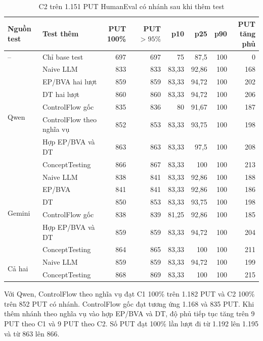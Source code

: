 \begin{table}[!htbp]
\centering
\caption{C2 trên 1.151 PUT HumanEval có nhánh sau khi thêm test}
\label{tab:coverage-he-c2}
\small
\begin{tabular*}{\linewidth}{@{\extracolsep{\fill}}llrrrrrr@{}}
\toprule
Nguồn test & Test thêm & \shortstack{PUT\\100\%} & \shortstack{PUT\\$>95\%$} & p10 & p25 & p90 & \shortstack{PUT\\tăng phủ} \\
\midrule
-- & Chỉ base test & 697 & 697 & 75 & 87,5 & 100 & 0 \\
\midrule
\multirow{7}{*}{Qwen} & Naive LLM & 833 & 833 & 83,33 & 92,86 & 100 & 168 \\
& EP/BVA hai lượt & 859 & 859 & 83,33 & 94,72 & 100 & 202 \\
& DT hai lượt & 860 & 860 & 83,33 & 94,72 & 100 & 206 \\
& ControlFlow gốc & 835 & 836 & 80 & 91,67 & 100 & 187 \\
& ControlFlow theo nghĩa vụ & 852 & 853 & 83,33 & 93,75 & 100 & 198 \\
& Hợp EP/BVA và DT & 863 & 863 & 83,33 & 97,5 & 100 & 208 \\
& ConceptTesting & 866 & 867 & 83,33 & 100 & 100 & 213 \\
\midrule
\multirow{6}{*}{Gemini} & Naive LLM & 838 & 841 & 83,33 & 92,86 & 100 & 188 \\
& EP/BVA & 841 & 841 & 83,33 & 92,86 & 100 & 186 \\
& DT & 850 & 853 & 83,33 & 93,75 & 100 & 198 \\
& ControlFlow gốc & 838 & 839 & 81,25 & 92,86 & 100 & 185 \\
& Hợp EP/BVA và DT & 859 & 859 & 83,33 & 94,72 & 100 & 204 \\
& ConceptTesting & 864 & 865 & 83,33 & 100 & 100 & 211 \\
\midrule
\multirow{2}{*}{Cả hai} & Naive LLM & 859 & 859 & 83,33 & 94,72 & 100 & 199 \\
& ConceptTesting & 868 & 869 & 83,33 & 100 & 100 & 215 \\
\bottomrule
\end{tabular*}
\end{table}

Với Qwen, ControlFlow theo nghĩa vụ đạt C1 100\% trên 1.182 PUT và C2 100\% trên 852 PUT có nhánh. ControlFlow gốc đạt tương ứng 1.168 và 835 PUT. Khi thêm nhánh theo nghĩa vụ vào hợp EP/BVA và DT, độ phủ tiếp tục tăng trên 9 PUT theo C1 và 9 PUT theo C2. Số PUT đạt 100\% lần lượt đi từ 1.192 lên 1.195 và từ 863 lên 866.

